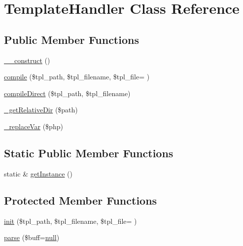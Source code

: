 \hypertarget{classTemplateHandler}{}\section{Template\+Handler Class Reference}
\label{classTemplateHandler}
\subsection*{Public Member Functions}
\begin{DoxyCompactItemize}
\item 
\hyperlink{classTemplateHandler_ab113c65769e65c4fe531c4cf41655f1d}{\+\_\+\+\_\+construct} ()
\item 
\hyperlink{classTemplateHandler_ae2e69591d815bb49316bb85adbaff581}{compile} (\$tpl\+\_\+path, \$tpl\+\_\+filename, \$tpl\+\_\+file= \textquotesingle{}\textquotesingle{})
\item 
\hyperlink{classTemplateHandler_a1fe9c84873c23970ea7779be59dcb2d5}{compile\+Direct} (\$tpl\+\_\+path, \$tpl\+\_\+filename)
\item 
\hyperlink{classTemplateHandler_a6d8e3da7128be8bded89dc9edc4a1bc8}{\+\_\+get\+Relative\+Dir} (\$path)
\item 
\hyperlink{classTemplateHandler_a10cb255c35e1e617f182e349b80cc335}{\+\_\+replace\+Var} (\$php)
\end{DoxyCompactItemize}
\subsection*{Static Public Member Functions}
\begin{DoxyCompactItemize}
\item 
static \& \hyperlink{classTemplateHandler_a9745460c5daccfc48abf8652778b2718}{get\+Instance} ()
\end{DoxyCompactItemize}
\subsection*{Protected Member Functions}
\begin{DoxyCompactItemize}
\item 
\hyperlink{classTemplateHandler_a783df180d319abe3722862ed6edacb9d}{init} (\$tpl\+\_\+path, \$tpl\+\_\+filename, \$tpl\+\_\+file= \textquotesingle{}\textquotesingle{})
\item 
\hyperlink{classTemplateHandler_acf0023ac6383d43e9b0ab854c75c0694}{parse} (\$buff=\hyperlink{modernizr_8min_8js_a286f9ec831c5e676eeb493248eab9575}{null})
\end{DoxyCompactItemize}


